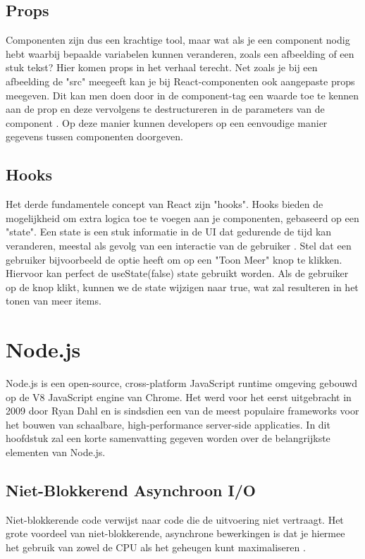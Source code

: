 \subsection{Props}
Componenten zijn dus een krachtige tool, maar wat als je een component nodig hebt waarbij bepaalde variabelen kunnen veranderen, zoals een afbeelding of een stuk tekst? Hier komen props in het verhaal terecht. Net zoals je bij een afbeelding de "src" meegeeft kan je bij React-componenten ook aangepaste props meegeven. Dit kan men doen door in de component-tag een waarde toe te kennen aan de prop en deze vervolgens te destructureren in de parameters van de component \autocite{NextJS2023}. Op deze manier kunnen developers op een eenvoudige manier gegevens tussen componenten doorgeven.

\subsection{Hooks}
Het derde fundamentele concept van React zijn "hooks". Hooks bieden de mogelijkheid om extra logica toe te voegen aan je componenten, gebaseerd op een "state". Een state is een stuk informatie in de UI dat gedurende de tijd kan veranderen, meestal als gevolg van een interactie van de gebruiker \autocite{NextJS2023}. Stel dat een gebruiker bijvoorbeeld de optie heeft om op een "Toon Meer" knop te klikken. Hiervoor kan perfect de useState(false) state gebruikt worden. Als de gebruiker op de knop klikt, kunnen we de state wijzigen naar true, wat zal resulteren in het tonen van meer items.

\section{Node.js}

Node.js is een open-source, cross-platform JavaScript runtime omgeving gebouwd op de V8 JavaScript engine van Chrome. Het werd voor het eerst uitgebracht in 2009 door Ryan Dahl en is sindsdien een van de meest populaire frameworks voor het bouwen van schaalbare, high-performance server-side applicaties. \autocite{Sufiyan2023} In dit hoofdstuk zal een korte samenvatting gegeven worden over de belangrijkste elementen van Node.js.

\subsection{Niet-Blokkerend Asynchroon I/O}

Niet-blokkerende code verwijst naar code die de uitvoering niet vertraagt. Het grote voordeel van niet-blokkerende, asynchrone bewerkingen is dat je hiermee het gebruik van zowel de CPU als het geheugen kunt maximaliseren \autocite{Sarkar2018}.

